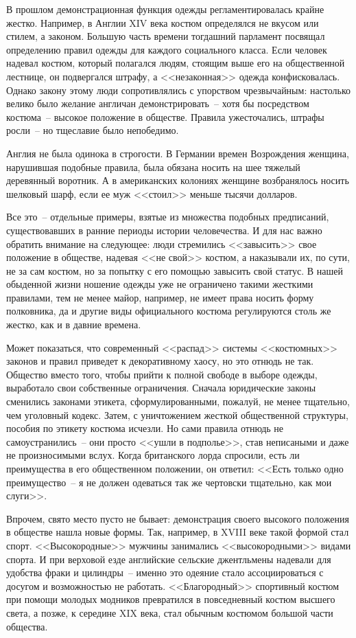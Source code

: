   В прошлом демонстрационная функция одежды регламентировалась крайне жестко.
  Например, в Англии XIV века костюм определялся не вкусом или стилем, а
  законом. Большую часть времени тогдашний парламент посвящал определению
  правил одежды для каждого социального класса. Если человек надевал костюм,
  который полагался людям, стоящим выше его на общественной лестнице, он
  подвергался штрафу, а <<незаконная>> одежда конфисковалась. Однако закону
  этому люди сопротивлялись с упорством чрезвычайным: настолько велико было
  желание англичан демонстрировать~-- хотя бы посредством костюма~-- высокое
  положение в обществе. Правила ужесточались, штрафы росли~-- но тщеславие
  было непобедимо.
  
  Англия не была одинока в строгости. В Германии времен Возрождения женщина,
  нарушившая подобные правила, была обязана носить на шее тяжелый деревянный
  воротник. А в американских колониях женщине возбранялось носить шелковый
  шарф, если ее муж <<стоил>> меньше тысячи долларов.
  
  Все это~-- отдельные примеры, взятые из множества подобных предписаний,
  существовавших в ранние периоды истории человечества. И для нас важно
  обратить внимание на следующее: люди стремились <<завысить>> свое положение
  в обществе, надевая <<не свой>> костюм, а наказывали их, по сути, не за сам
  костюм, но за попытку с его помощью завысить свой статус. В нашей обыденной
  жизни ношение одежды уже не ограничено такими жесткими правилами, тем не
  менее майор, например, не имеет права носить форму полковника, да и другие
  виды официального костюма регулируются столь же жестко, как и в давние
  времена.
  
  Может показаться, что современный <<распад>> системы <<костюмных>> законов и
  правил приведет к декоративному хаосу, но это отнюдь не так. Общество вместо
  того, чтобы прийти к полной свободе в выборе одежды, выработало свои
  собственные ограничения. Сначала юридические законы сменились законами
  этикета, сформулированными, пожалуй, не менее тщательно, чем уголовный
  кодекс. Затем, с уничтожением жесткой общественной структуры, пособия по
  этикету костюма исчезли. Но сами правила отнюдь не самоустранились~-- они
  просто <<ушли в подполье>>, став неписаными и даже не произносимыми вслух.
  Когда британского лорда спросили, есть ли преимущества в его общественном
  положении, он ответил: <<Есть только одно преимущество~-- я не должен
  одеваться так же чертовски тщательно, как мои слуги>>.
  
  Впрочем, свято место пусто не бывает: демонстрация своего высокого положения
  в обществе нашла новые формы. Так, например, в XVIII веке такой формой
  стал спорт. <<Высокородные>> мужчины занимались <<высокородными>> видами
  спорта. И при верховой езде английские сельские джентльмены надевали для
  удобства фраки и цилиндры~-- именно это одеяние стало ассоциироваться с
  досугом и возможностью не работать. <<Благородный>> спортивный костюм при
  помощи молодых модников превратился в повседневный костюм высшего света, а
  позже, к середине XIX века, стал обычным костюмом большой части
  общества.
  
